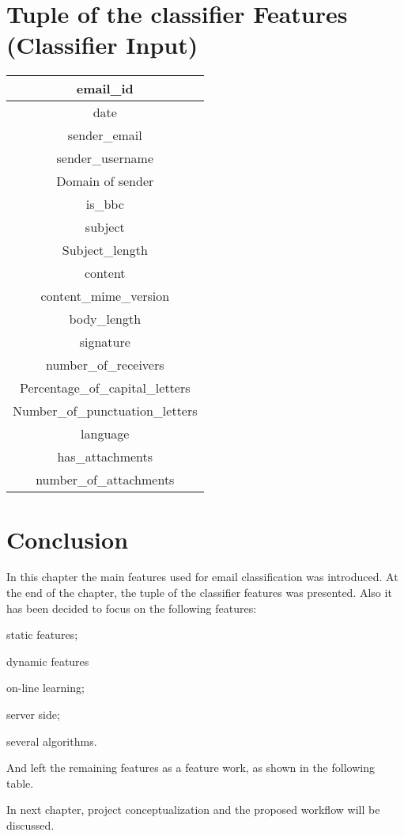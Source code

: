 \newpage
\section {Tuple of the classifier Features (Classifier Input)}

\begin{center}
\begin{tabular}{|c|}
\hline 
email\_id\tabularnewline
\hline
date\tabularnewline
\hline 
sender\_email\tabularnewline
\hline 
sender\_username\tabularnewline
\hline 
Domain of sender\tabularnewline
\hline 
is\_bbc\tabularnewline
\hline 
subject\tabularnewline
\hline 
Subject\_length\tabularnewline
\hline 
content\tabularnewline
\hline 
content\_mime\_version\tabularnewline
\hline 
body\_length\tabularnewline
\hline 
signature\tabularnewline
\hline 
number\_of\_receivers\tabularnewline
\hline 
Percentage\_of\_capital\_letters\tabularnewline
\hline 
Number\_of\_punctuation\_letters\tabularnewline
\hline 
language\tabularnewline
\hline 
has\_attachments\tabularnewline
\hline 
number\_of\_attachments\tabularnewline
\hline
\end{tabular}
\end{center}

\newpage


\section{Conclusion}
In this chapter the main features used for email classification was introduced.
At the end of the chapter, the tuple of the classifier features was presented.
Also it has been decided to focus on the following features:
\begin{my_itemize}
  \item static features;
  \item dynamic features
  \item on-line learning;
  \item server side;
  \item several algorithms.
\end{my_itemize}
And left the remaining features as a feature work, as shown in the following 
table.

In next chapter, project conceptualization and the proposed workflow will be 
discussed.

